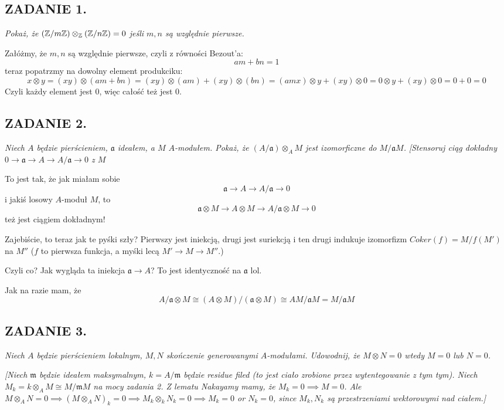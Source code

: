 \documentclass{article}
\begin{document}
\subsection*{ZADANIE 1.}
\emph{\color{pink}Pokaż, że $(\mathbb{Z}/m\mathbb{Z})\otimes_{\mathbb{Z}}(\mathbb{Z}/n\mathbb{Z})=0$ jeśli $m,n$ są względnie
pierwsze.}
\smallskip

Załóżmy, że $m,n$ są względnie pierwsze, czyli z równości Bezout'a:
$$am+bn=1$$
teraz popatrzmy na dowolny element produkciku:
$$x\otimes y=(xy)\otimes (am+bn)=(xy)\otimes(am)+(xy)\otimes(bn)=(amx)\otimes y+(xy)\otimes
0=0\otimes y+(xy)\otimes 0=0+0=0$$
Czyli każdy element jest $0$, więc całość też jest $0$.

\subsection*{ZADANIE 2.}
\emph{\color{pink}Niech $A$ będzie pierścieniem, $\mathfrak{a}$ ideałem, a $M$
$A$-modułem. Pokaż, że $(A/\mathfrak{a})\otimes_A M$ jest izomorficzne do
$M/\mathfrak{a}M$.}
\emph{[Stensoruj ciąg dokładny $0\to\mathfrak{a}\to A\to A/\mathfrak{a}\to0$ z $M$}
\smallskip

To jest tak, że jak miałam sobie
$$\mathfrak{a}\to A\to A/\mathfrak{a}\to 0$$
i jakiś losowy $A$-moduł $M$, to
$$\mathfrak{a}\otimes M\to A\otimes M\to A/\mathfrak{a}\otimes M\to 0$$
też jest ciągiem dokładnym!

Zajebiście, to teraz jak te pyśki szły? Pierwszy jest iniekcją, drugi jest suriekcją i ten drugi indukuje izomorfizm $Coker(f)=M/f(M')$ na $M''$ ($f$ to pierwsza funkcja, a myśki lecą $M'\to M\to M''$.) 

Czyli co? Jak wygląda ta iniekcja $\mathfrak{a}\to A$? To jest identyczność na $\mathfrak{a}$ lol.

Jak na razie mam, że
$$A/\mathfrak{a}\otimes M\cong (A\otimes M)/(\mathfrak{a}\otimes M)\cong AM/\mathfrak{a}M=M/\mathfrak{a}M$$

\subsection*{ZADANIE 3.}
\emph{\color{yellow}Niech $A$ będzie pierścieniem lokalnym, $M,N$ skończenie generowanymi $A$-modułami. Udowodnij, że $M\otimes N=0$ wtedy $M=0$ lub $N=0$.}

\emph{\color{yellow}[Niech $\mathfrak{m}$ będzie ideałem maksymalnym, $k=A/\mathfrak{m}$ będzie residue filed (to jest ciało zrobione przez wytentegowanie z tym tym). Niech $M_k=k\otimes_AM\cong M/\mathfrak{m}M$ na mocy zadania 2. Z lematu Nakayamy mamy, że $M_k=0\implies M=0$. Ale $M\otimes_AN=0\implies (M\otimes_AN)_k=0\implies M_k\otimes_kN_k=0\implies M_k=0$ or $N_k=0$, since $M_k,N_k$ są przestrzeniami wektorowymi nad ciałem.]}
\smallskip
\end{document}
